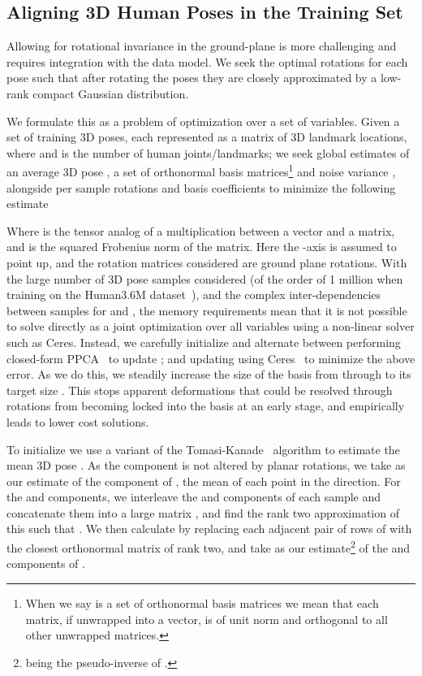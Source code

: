 \documentclass[10pt,twocolumn,letterpaper]{article}
\begin{document}
\subsection{Aligning 3D Human Poses in the Training Set}
\label{sec:aligning-non-rigid}

Allowing for rotational invariance in the ground-plane is more
challenging and requires integration with the  data model. We seek the
optimal rotations for each pose such that after rotating the poses
they are closely approximated by a low-rank compact Gaussian
distribution.

We formulate this as a problem of optimization over a set of
variables. Given a set of  training 3D poses, each represented as a
 matrix  of 3D landmark locations, where
 and  is the number of human joints/landmarks; we
seek global estimates of an average 3D pose , a set of 
orthonormal basis matrices\footnote{When we say  is a set of
  orthonormal basis matrices we mean that each matrix, if unwrapped
  into a vector, is of unit norm and orthogonal to all other unwrapped
  matrices.}  and noise variance , alongside per
sample rotations  and basis coefficients  to minimize
the following estimate 


Where  is the tensor analog
of a multiplication between a vector and a matrix, and  is
the squared Frobenius norm of the matrix. Here the -axis is assumed to point up, and the rotation matrices
 considered are ground plane rotations. With the large number of 3D pose samples considered (of the order of 1 million
when training on the Human3.6M dataset~\cite{ionescu2014human3}), and the
complex inter-dependencies between samples for  and , the
memory requirements mean that it is not possible to solve directly as a joint
optimization over all variables using a non-linear solver such as Ceres.
Instead, we carefully initialize and alternate between performing closed-form
PPCA~\cite{Tipping99probabilisticprincipal} to update ; and updating  using Ceres~\cite{ceres-solver} to minimize the
above error.
As we do this, we steadily increase the size of the basis from 
through to its target size .  This stops apparent deformations that
could be resolved through rotations from becoming locked into the
basis at an early stage, and empirically leads to lower cost
solutions.

To initialize we use a variant of the Tomasi-Kanade~\cite{Tomasi1992}
algorithm to estimate the mean 3D pose . As the 
component is not altered by planar rotations, we take as our estimate
of the  component of , the mean of each point in the
 direction. For the  and  components, we interleave the 
and  components of each sample and concatenate them into a large
 matrix , and find the
rank two approximation of this such that . We
then calculate  by replacing each adjacent pair of rows
of  with the closest orthonormal matrix of rank two, and take
 as our estimate\footnote{ being the
  pseudo-inverse of .}  of the  and 
components of .
\end{document}
